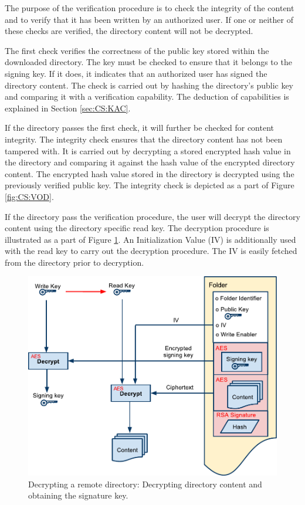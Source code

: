 \documentclass[pdftex,english,10pt,b5paper,twoside]{book}
\begin{document}
The purpose of the verification procedure is to check the integrity of the
content and to verify that it has been written by an authorized user. 
If one or neither of these checks are verified, the directory content will not
be decrypted.

The first check verifies the correctness of the public key stored within the 
downloaded directory. The key must be checked to ensure that it belongs to the signing
key. If it does, it indicates that an authorized user has signed the directory
content. The check is carried out by hashing the directory's public key and
comparing it with a verification capability. The deduction of capabilities is
explained in Section \ref{sec:CS:KAC}.

If the directory passes the first check, it will further be checked for content
integrity. The integrity check ensures that the directory content has not been
tampered with. It is carried out by decrypting a stored encrypted hash value in the
directory and comparing it against the hash value of the encrypted directory
content. The encrypted hash value stored in the directory is decrypted using the
previously verified public key. The integrity check is depicted as a part of Figure
\ref{fig:CS:VOD}.

If the directory pass the verification procedure, the user will decrypt the
directory content using the directory specific read key. The decryption procedure
is illustrated as a part of Figure \ref{fig:CS:OD}. An Initialization Value (IV) is
additionally used with the read key to carry out the decryption procedure. The
IV is easily fetched from the directory prior to decryption.

\begin{figure}[h!]
    \centering
    \includegraphics[width=\columnwidth]{OpenFolder.pdf}
    \caption{Decrypting a remote directory: Decrypting directory content and
    obtaining the signature key.}
    \label{fig:CS:OD}
\end{figure}
\end{document}
